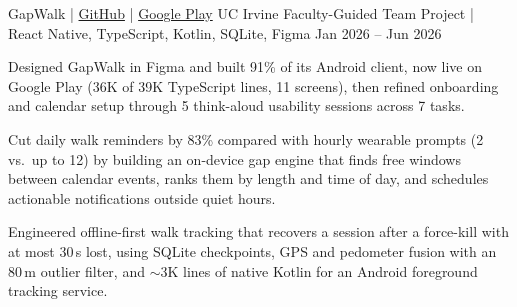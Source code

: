 
\projectEntry
  {GapWalk |
   \href{https://github.com/GutsJr75/GapWalk_the_microwalk_project}
   {GitHub} |
   \href{https://play.google.com/store/apps/details?id=com.gapwalk.app}
   {Google Play}}
  {UC Irvine Faculty-Guided Team Project |
   React Native, TypeScript, Kotlin, SQLite, Figma}
  {Jan 2026 -- Jun 2026}

\begin{resumeBullets}

  \item Designed GapWalk in Figma and built 91\% of
  its Android client, now live on Google Play
  (36K of 39K TypeScript lines, 11 screens), then
  refined onboarding and calendar setup through
  5 think-aloud usability sessions across 7 tasks.

  \item Cut daily walk reminders by 83\% compared
  with hourly wearable prompts (2 vs.\ up to 12) by
  building an on-device gap engine that finds free
  windows between calendar events, ranks them by
  length and time of day, and schedules actionable
  notifications outside quiet hours.

  \item Engineered offline-first walk tracking that
  recovers a session after a force-kill with at most
  30\,s lost, using SQLite checkpoints, GPS and
  pedometer fusion with an 80\,m outlier filter, and
  $\sim$3K lines of native Kotlin for an Android
  foreground tracking service.

\end{resumeBullets}
